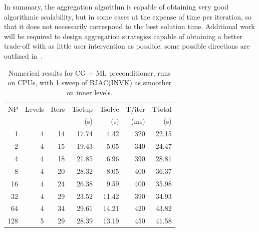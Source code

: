 In summary, the aggregation algorithm is capable of obtaining very
good algorithmic scalability, but in some cases at the expense of time
per iteration, so that it does not necessarily correspond to the best 
solution time. 
Additional work will be required to design aggregation
strategies capable of obtaining a better trade-off with as little user
intervention as possible; some possible directions are outlined
in~\cite{bcm-toms}.  




\iffalse
\begin{table}[h!]
\centering
\caption{Numerical results for CG + ML preconditioner, runs on CPUs, with 1 sweep of BJAC(INVK) as smoother on inner levels.}
\label{cpu-invk}

\begin{tabular}{rrrrrrr}
NP  & Levels & Iters & Tsetup & Tsolve & T/iter & Ttotal \\
    &        &       & (s)    & (s)    & (ms)   & (s)    \\
\hline
1   & 4       & 14  & 17.74 & 4.42  & 320      & 22.15   \\
2   & 4       & 15  & 19.43 & 5.05  & 340      & 24.47   \\
4   & 4       & 18  & 21.85 & 6.96  & 390      & 28.81   \\
8   & 4       & 20  & 28.32 & 8.05  & 400      & 36.37   \\
16  & 4       & 24  & 26.38 & 9.59  & 400      & 35.98   \\
32  & 4       & 29  & 23.52 & 11.42 & 390      & 34.93   \\
64  & 4       & 34  & 29.61 & 14.21 & 420      & 43.82   \\
128 & 5       & 29  & 28.39 & 13.19 & 450      & 41.58    \\
\hline
\end{tabular}
\end{table}

